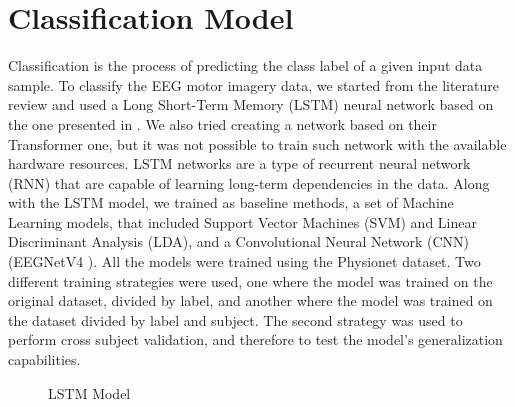 \section{Classification Model}
Classification is the process of predicting the class label of a given input data sample.
To classify the EEG motor imagery data, we started from the literature review and used a Long Short-Term Memory (LSTM) neural network based on the one presented in \cite{sharma_deep_2023}. 
We also tried creating a network based on their Transformer one, but it was not possible to train such network with the available hardware resources.
LSTM networks are a type of recurrent neural network (RNN) that are capable of learning long-term dependencies in the data.
Along with the LSTM model, we trained as baseline methods, a set of Machine Learning models, that included Support Vector Machines (SVM) and Linear Discriminant Analysis (LDA), and a Convolutional Neural Network (CNN) (EEGNetV4 \cite{lawhern2018eegnet}).
All the models were trained using the Physionet dataset. 
Two different training strategies were used, one where the model was trained on the original dataset, divided by label, and another where the model was trained on the dataset divided by label and subject.
The second strategy was used to perform cross subject validation, and therefore to test the model's generalization capabilities.
\begin{figure}[!htbp]
    \centering
    \caption{LSTM Model}
    \label{fig:lstm}
\end{figure}


